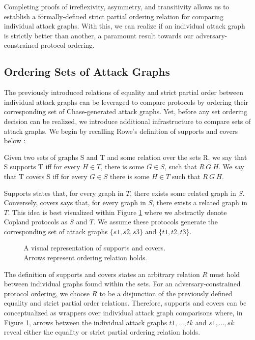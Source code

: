 \documentclass[runningheads]{llncs}
\theoremstyle{definition}
\begin{document}
Completing proofs of irreflexivity, asymmetry, and transitivity allows us to establish a formally-defined strict partial ordering relation for comparing individual attack graphs. With this, we can realize if an individual attack graph is strictly better than another, a paramount result towards our adversary-constrained protocol ordering.

\subsection*{Ordering Sets of Attack Graphs}

The previously introduced relations of equality and strict partial order between individual attack graphs can be leveraged to compare protocols by ordering their corresponding set of Chase-generated attack graphs. Yet, before any set ordering decision can be realized, we introduce additional infrastructure to compare sets of attack graphs. We begin by recalling Rowe's definition of supports and covers below \cite{Rowe:2021:OnOrdering}:

\begin{definition}
    Given two sets of graphs S and T and some relation over the sets R, we say that S supports T iff for every $H \in T$, there is some $G \in S$, such that $R\: G\: H$. We  say that T covers S iff for every $G \in S$ there is some $H \in T$ such that $R\: G\: H$.
\end{definition}

Supports states that, for every graph in $T$, there exists some related graph in $S$. Conversely, covers says that, for every graph in $S$, there exists a related graph in $T$.  This idea is best visualized within Figure \ref{fig:sup-cov} where we abstractly denote Copland protocols as $S$ and $T$. We assume these protocols generate the corresponding set of attack graphs $\{s1, s2 , s3 \}$ and $ \{t1, t2 ,t3\}$.

\begin{figure}[htbp]
    \centering
    
    \captionsetup{justification=centering,margin=1cm}
    \caption[Supports and covers]{A visual representation of supports and covers. \\ Arrows represent ordering relation holds.}
    \label{fig:sup-cov}
\end{figure}

The definition of supports and covers states an arbitrary relation $R$ must hold between individual graphs found within the sets. For an adversary-constrained protocol ordering, we choose $R$ to be a disjunction of the previously defined equality and strict partial order relations. Therefore, supports and covers can be conceptualized as wrappers over individual attack graph comparisons where, in Figure \ref{fig:sup-cov}, arrows between the individual attack graphs $t1, ... ,tk$ and $s1, ... ,sk$ reveal either the equality or strict partial ordering relation holds. 
\end{document}

